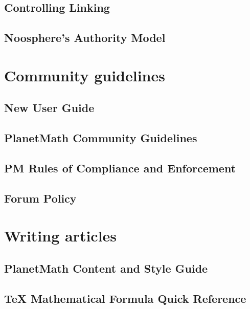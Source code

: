 \documentclass[12pt,report]{memoir}
\begin{document}
\section{Controlling Linking}


\section{Noosphere's Authority Model}


\chapter{Community guidelines}

\section{New User Guide}


\section{PlanetMath Community Guidelines}


\section{PM Rules of Compliance and Enforcement}


\section{Forum Policy}


\chapter{Writing articles}

\section{PlanetMath Content and Style Guide}


\section{TeX Mathematical Formula Quick Reference}

\end{document}
